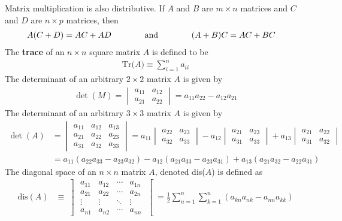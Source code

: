 Matrix multiplication is also distributive. If $A$ and $B$ are $m\times n$ matrices and $C$ and $D$ are $n \times p$ matrices, then
\begin{align}
A(C+D)	&=	AC+AD\hspace{1.4cm}\textrm{and}\hspace{1.4cm}
(A+B)C	=	AC+BC
\end{align}
The \textbf{trace} of an $n\times n$ square matrix $A$ is defined to be 
\begin{align}
\textrm{Tr($A$)}\equiv\sum_{i=1}^{n}a_{ii}
\end{align}
The determinant of an arbitrary $2 \times 2$ matrix $A$ is given by
\begin{align}
	\det(M) = \begin{vmatrix}
		a_{11} & a_{12} \\
		a_{21} & a_{22}
	\end{vmatrix} = a_{11}a_{22}-a_{12}a_{21}
\end{align}
The determinant of an arbitrary $3 \times 3$ matrix $A$ is given by
\begin{align}
	\det(A) &= \begin{vmatrix}
		a_{11} & a_{12} & a_{13} \\
		a_{21} & a_{22} & a_{23} \\
		a_{31} & a_{32} & a_{33}
	\end{vmatrix}  = a_{11}\begin{vmatrix}
	a_{22} & a_{23} \\
	a_{32} & a_{33}
\end{vmatrix} -a_{12}\begin{vmatrix}
a_{21} & a_{23} \\
a_{31} & a_{33}
\end{vmatrix} + a_{13}\begin{vmatrix}
a_{21} & a_{22} \\
a_{31} & a_{32}
\end{vmatrix} \\
&=a_{11}(a_{22}a_{33}-a_{23}a_{32})-a_{12}(a_{21}a_{33}-a_{23}a_{31})+a_{13}(a_{21}a_{32}-a_{22}a_{31})
\end{align}
The diagonal space of an $n \times n$ matrix $A$, denoted dis($A$) is defined as
\begin{align}
	\textrm{dis}(A) &\equiv \left] \begin{array}{cccc}
		a_{11} & a_{12} & \cdots & a_{1n} \\
		a_{21} & a_{22} & \cdots & a_{2n} \\
		\vdots & \vdots & \ddots  & \vdots \\
		a_{n1} & a_{n2} & \cdots & a_{nn}
	\end{array} \right[  = \frac{1}{2}\sum_{n=1}^{n}\sum_{k=1}^{n}\left(a_{kn}a_{nk}-a_{nn}a_{kk}\right)
\end{align}
